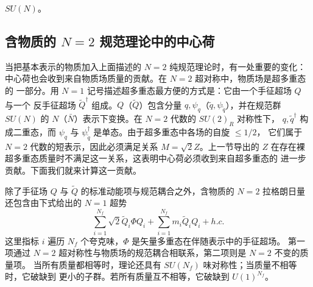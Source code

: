 $SU(N)$。

\subsection{含物质的 $N=2$ 规范理论中的中心荷}

当把基本表示的物质加入上面描述的 $N=2$ 纯规范理论时，有一处重要的变化：
中心荷也会收到来自物质场质量的贡献。在 $N=2$ 超对称中，物质场是超多重态的
一部分。用 $N=1$ 记号描述超多重态最方便的方式是：它由一个手征超场 $Q$ 与一个
反手征超场 $\widetilde Q^\dagger$ 组成。$Q$（$\widetilde Q$）包含分量
$q,\psi_q$（$\widetilde q,\psi_{\widetilde q}$），并在规范群 $SU(N)$ 的
$N$（$\bar{N}$）表示下变换。在 $N=2$ 代数的 $SU(2)_{R}$ 对称性下，
$q,\widetilde q^\dagger$ 构成二重态，而 $\psi_q$ 与
$\psi^\dagger_{\tilde q}$ 是单态。由于超多重态中各场的自旋 $\leq 1/2$，
它们属于 $N=2$ 代数的短表示，因此必须满足关系 $M=\sqrt{2} Z$。上一节导出的
$Z$ 在存在裸超多重态质量时不满足这一关系，这表明中心荷必须收到来自超多重态的
进一步贡献。下面我们就来计算这一贡献。

除了手征场 $Q$ 与 $\widetilde Q$ 的标准动能项与规范耦合之外，含物质的 $N=2$
拉格朗日量还包含由下式给出的 $N=1$ 超势
$$
\sum_{i=1}^{N_f}\sqrt{2}\widetilde{Q}_i\Phi Q_i+\sum_{i=1}^{N_f} m_i 
\widetilde{Q}_i Q_i + h.c.
$$
这里指标 $i$ 遍历 $N_f$ 个夸克味，$\Phi$ 是矢量多重态在伴随表示中的手征超场。
第一项通过 $N=2$ 超对称性与物质场的规范耦合相联系，第二项则是 $N=2$ 不变的质量项。
当所有质量都相等时，理论还具有 $SU(N_f)$ 味对称性；当质量不相等时，它破缺到
更小的子群。若所有质量互不相等，它破缺到 $U(1)^{N_f}$。

